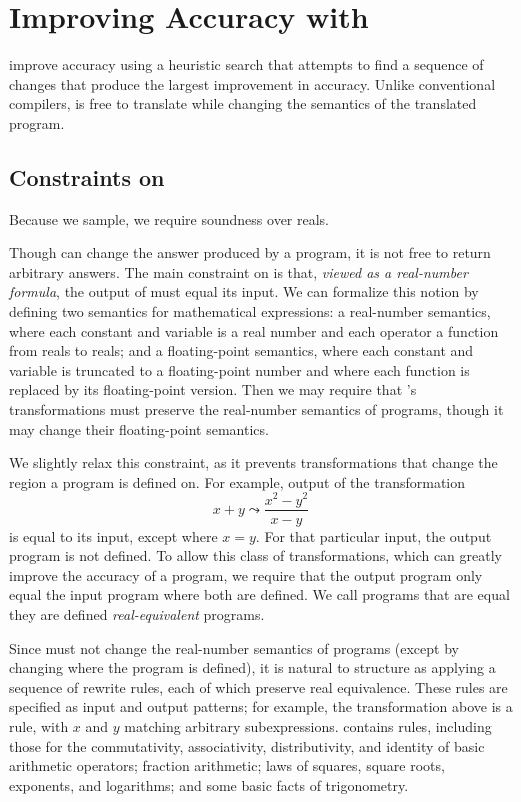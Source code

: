 \documentclass[paper.tex]{subfiles}
\begin{document}
\section{Improving Accuracy with  \casio}
\label{sec:synthesis}

\casio improve accuracy using a heuristic search that attempts to find
a sequence of changes that produce the largest improvement in
accuracy.  Unlike conventional compilers, \casio is free to translate
while changing the semantics of the translated program.

\subsection{Constraints on \casio}

Because we sample, we require soundness over reals.

Though \casio can change the answer produced by a program,
  it is not free to return arbitrary answers.
The main constraint on \casio
  is that, \emph{viewed as a real-number formula},
  the output of \casio must equal its input.
We can formalize this notion by defining
  two semantics for mathematical expressions:
  a real-number semantics,
  where each constant and variable is a real number
  and each operator a function from reals to reals;
  and a floating-point semantics,
  where each constant and variable is truncated
  to a floating-point number
  and where each function is replaced by its floating-point version.
Then we may require that \casio's transformations
  must preserve the real-number semantics of programs,
  though it may change their floating-point semantics.

We slightly relax this constraint,
  as it prevents transformations that change
  the region a program is defined on.
For example, output of the transformation
\[
  x + y \leadsto \frac{x^2 - y^2}{x - y}
\]
  is equal to its input, except where $x = y$.
For that particular input, the output program is not defined.
To allow this class of transformations,
  which can greatly improve the accuracy of a program,
  we require that the output program
  only equal the input program where both are defined.
We call programs that are equal they are defined \emph{real-equivalent} programs.

Since \casio must not change the real-number semantics of programs
  (except by changing where the program is defined),
  it is natural to structure \casio
  as applying a sequence of rewrite rules,
  each of which preserve real equivalence.
These rules are specified as input and output patterns;
  for example, the transformation above is a rule,
  with $x$ and $y$ matching arbitrary subexpressions.
\casio contains \nRewrites rules,
  including those for
  the commutativity, associativity, distributivity, and identity
  of basic arithmetic operators;
  fraction arithmetic;
  laws of squares, square roots, exponents, and logarithms;
  and some basic facts of trigonometry.
\end{document}
